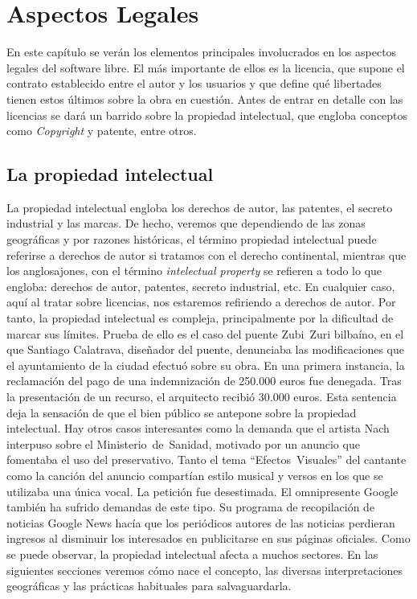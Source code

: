 %
%

\chapter{Aspectos Legales}
\label{CHAP2:LegalAspects}
En este capítulo se verán los elementos principales involucrados en
los aspectos legales del software libre. El más importante de ellos es
la licencia, que supone el contrato establecido entre el autor y los
usuarios y que define qué libertades tienen estos últimos sobre la
obra en cuestión. Antes de entrar en detalle con las licencias se dará
un barrido sobre la propiedad intelectual, que engloba conceptos como
\emph{Copyright} y patente, entre otros.

\section{La propiedad intelectual}
La propiedad intelectual engloba los derechos de autor, las patentes,
el secreto industrial y las marcas. De hecho, veremos que dependiendo de las
zonas geográficas y por razones históricas, el término propiedad
intelectual puede referirse a derechos de autor si tratamos con el derecho
continental, mientras que los anglosajones, con el término \textit{intelectual
property} se refieren a todo lo que engloba: derechos de autor, patentes,
secreto industrial, etc. En cualquier caso, aquí al tratar sobre licencias,
nos estaremos refiriendo a derechos de autor. Por tanto, la propiedad
intelectual es compleja, principalmente por la dificultad de marcar sus límites.
Prueba de ello es el caso del puente Zubi~Zuri bilbaíno, en el que Santiago
Calatrava, diseñador del puente, denunciaba las modificaciones que el
ayuntamiento de la ciudad efectuó sobre su obra. En una primera instancia, la
reclamación del pago de una indemnización de 250.000 euros fue denegada. Tras la
presentación de un recurso, el arquitecto recibió 30.000 euros. Esta
sentencia deja la sensación de que el bien público se antepone sobre
la propiedad intelectual. Hay otros casos interesantes como la demanda
que el artista Nach interpuso sobre el Ministerio~de~Sanidad, motivado
por un anuncio que fomentaba el uso del preservativo. Tanto el tema
``Efectos~Visuales'' del cantante como la canción del anuncio
compartían estilo musical y versos en los que se utilizaba una única
vocal. La petición fue desestimada. El omnipresente Google también ha
sufrido demandas de este tipo. Su programa de recopilación de noticias
Google News hacía que los periódicos autores de las noticias perdieran
ingresos al disminuir los interesados en publicitarse en sus páginas
oficiales. Como se puede observar, la propiedad intelectual afecta a
muchos sectores. En las siguientes secciones veremos cómo nace el
concepto, las diversas interpretaciones geográficas y las prácticas
habituales para salvaguardarla.

